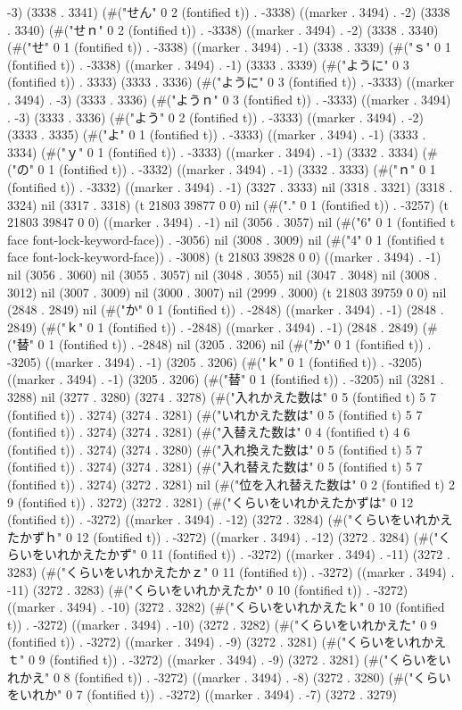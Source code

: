 -3) (3338 . 3341) (#("せん" 0 2 (fontified t)) . -3338) ((marker . 3494) . -2) (3338 . 3340) (#("せｎ" 0 2 (fontified t)) . -3338) ((marker . 3494) . -2) (3338 . 3340) (#("せ" 0 1 (fontified t)) . -3338) ((marker . 3494) . -1) (3338 . 3339) (#("ｓ" 0 1 (fontified t)) . -3338) ((marker . 3494) . -1) (3333 . 3339) (#("ように" 0 3 (fontified t)) . 3333) (3333 . 3336) (#("ように" 0 3 (fontified t)) . -3333) ((marker . 3494) . -3) (3333 . 3336) (#("ようｎ" 0 3 (fontified t)) . -3333) ((marker . 3494) . -3) (3333 . 3336) (#("よう" 0 2 (fontified t)) . -3333) ((marker . 3494) . -2) (3333 . 3335) (#("よ" 0 1 (fontified t)) . -3333) ((marker . 3494) . -1) (3333 . 3334) (#("ｙ" 0 1 (fontified t)) . -3333) ((marker . 3494) . -1) (3332 . 3334) (#("の" 0 1 (fontified t)) . -3332) ((marker . 3494) . -1) (3332 . 3333) (#("ｎ" 0 1 (fontified t)) . -3332) ((marker . 3494) . -1) (3327 . 3333) nil (3318 . 3321) (3318 . 3324) nil (3317 . 3318) (t 21803 39877 0 0) nil (#("." 0 1 (fontified t)) . -3257) (t 21803 39847 0 0) ((marker . 3494) . -1) nil (3056 . 3057) nil (#("6" 0 1 (fontified t face font-lock-keyword-face)) . -3056) nil (3008 . 3009) nil (#("4" 0 1 (fontified t face font-lock-keyword-face)) . -3008) (t 21803 39828 0 0) ((marker . 3494) . -1) nil (3056 . 3060) nil (3055 . 3057) nil (3048 . 3055) nil (3047 . 3048) nil (3008 . 3012) nil (3007 . 3009) nil (3000 . 3007) nil (2999 . 3000) (t 21803 39759 0 0) nil (2848 . 2849) nil (#("か" 0 1 (fontified t)) . -2848) ((marker . 3494) . -1) (2848 . 2849) (#("ｋ" 0 1 (fontified t)) . -2848) ((marker . 3494) . -1) (2848 . 2849) (#("替" 0 1 (fontified t)) . -2848) nil (3205 . 3206) nil (#("か" 0 1 (fontified t)) . -3205) ((marker . 3494) . -1) (3205 . 3206) (#("ｋ" 0 1 (fontified t)) . -3205) ((marker . 3494) . -1) (3205 . 3206) (#("替" 0 1 (fontified t)) . -3205) nil (3281 . 3288) nil (3277 . 3280) (3274 . 3278) (#("入れかえた数は" 0 5 (fontified t) 5 7 (fontified t)) . 3274) (3274 . 3281) (#("いれかえた数は" 0 5 (fontified t) 5 7 (fontified t)) . 3274) (3274 . 3281) (#("入替えた数は" 0 4 (fontified t) 4 6 (fontified t)) . 3274) (3274 . 3280) (#("入れ換えた数は" 0 5 (fontified t) 5 7 (fontified t)) . 3274) (3274 . 3281) (#("入れ替えた数は" 0 5 (fontified t) 5 7 (fontified t)) . 3274) (3272 . 3281) nil (#("位を入れ替えた数は" 0 2 (fontified t) 2 9 (fontified t)) . 3272) (3272 . 3281) (#("くらいをいれかえたかずは" 0 12 (fontified t)) . -3272) ((marker . 3494) . -12) (3272 . 3284) (#("くらいをいれかえたかずｈ" 0 12 (fontified t)) . -3272) ((marker . 3494) . -12) (3272 . 3284) (#("くらいをいれかえたかず" 0 11 (fontified t)) . -3272) ((marker . 3494) . -11) (3272 . 3283) (#("くらいをいれかえたかｚ" 0 11 (fontified t)) . -3272) ((marker . 3494) . -11) (3272 . 3283) (#("くらいをいれかえたか" 0 10 (fontified t)) . -3272) ((marker . 3494) . -10) (3272 . 3282) (#("くらいをいれかえたｋ" 0 10 (fontified t)) . -3272) ((marker . 3494) . -10) (3272 . 3282) (#("くらいをいれかえた" 0 9 (fontified t)) . -3272) ((marker . 3494) . -9) (3272 . 3281) (#("くらいをいれかえｔ" 0 9 (fontified t)) . -3272) ((marker . 3494) . -9) (3272 . 3281) (#("くらいをいれかえ" 0 8 (fontified t)) . -3272) ((marker . 3494) . -8) (3272 . 3280) (#("くらいをいれか" 0 7 (fontified t)) . -3272) ((marker . 3494) . -7) (3272 . 3279) 